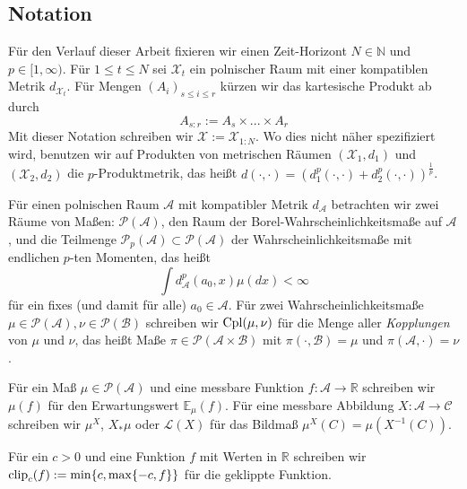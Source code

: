 \subsection{Notation}
Für den Verlauf dieser Arbeit fixieren wir einen Zeit-Horizont $N \in \mathbb{N}$ und $p \in [1,\infty)$. Für $1\leq t \leq N$ sei $\mathcal{X}_t$ ein polnischer Raum mit einer kompatiblen Metrik $d_{\mathcal{X}_t}$. Für Mengen $\left(A_{i}\right)_{s\leq i \leq r}$ kürzen wir das kartesische Produkt ab durch
$$A_{s:r} := A_s \times ... \times A_r$$
Mit dieser Notation schreiben wir $\mathcal{X}:=\mathcal{X}_{1:N}$. Wo dies nicht näher spezifiziert wird, benutzen wir auf Produkten von metrischen Räumen $(\mathcal{X}_1, d_1)$ und $(\mathcal{X}_2, d_2)$ die $p$-Produktmetrik, das heißt $d(\cdot, \cdot) = \left(d_1^p(\cdot, \cdot) + d_2^p(\cdot, \cdot) \right)^\frac{1}{p}$.

Für einen polnischen Raum $\mathcal{A}$ mit kompatibler Metrik $d_\mathcal{A}$ betrachten wir zwei Räume von Maßen: $\mathcal{P}(\mathcal{A})$, den Raum der Borel-Wahrscheinlichkeitsmaße auf $\mathcal{A}$, und die Teilmenge $\mathcal{P}_p(\mathcal{A}) \subset \mathcal{P}(\mathcal{A})$ der Wahrscheinlichkeitsmaße mit endlichen $p$-ten Momenten, das heißt
$$\int d_\mathcal{A}^p(a_0, x) \mu(dx) < \infty$$
für ein fixes (und damit für alle) $a_0 \in \mathcal{A}$. Für zwei Wahrscheinlichkeitsmaße $\mu \in \mathcal{P}(\mathcal{A}), \nu \in \mathcal{P}(\mathcal{B})$ schreiben wir $\operatorname{Cpl}(\mu, \nu)$ für die Menge aller \emph{Kopplungen} von $\mu$ und $\nu$, das heißt Maße $\pi \in \mathcal{P}(\mathcal{A} \times \mathcal{B})$ mit $\pi(\cdot, \mathcal{B})= \mu$ und $\pi(\mathcal{A}, \cdot)=\nu$. 

Für ein Maß $\mu \in \mathcal{P}(\mathcal{A})$ und eine messbare Funktion $f: \mathcal{A} \rightarrow \mathbb{R}$ schreiben wir $\mu(f)$ für den Erwartungswert $\mathbb{E}_\mu(f)$. Für eine messbare Abbildung $X: \mathcal{A} \rightarrow \mathcal{C}$ schreiben wir $\mu^X$, $X_*\mu$ oder $\mathcal{L}(X)$ für das Bildmaß $\mu^X(C) = \mu(X^{-1}(C))$. 

Für ein $c>0$ und eine Funktion $f$ mit Werten in $\mathbb{R}$ schreiben wir $\operatorname{clip}_c(f):= \min\{c, \max\{-c, f\}\}$ für die geklippte Funktion.

